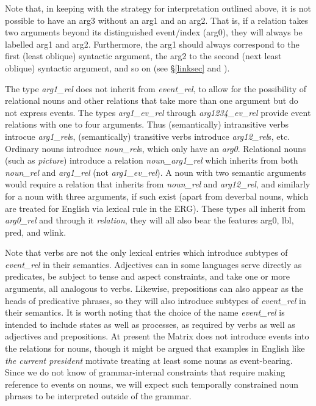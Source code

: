 \documentclass[12pt]{article}
\begin{document}
Note that, in keeping with the strategy for interpretation outlined
above, it is not possible to have an {\sc arg3} without an {\sc arg1}
and an {\sc arg2}.  That is, if a relation takes two arguments 
beyond its distinguished event/index ({\sc arg0}), they will always
be labelled {\sc arg1} and {\sc arg2}.  Furthermore, the {\sc arg1}
should always correspond to the first (least oblique) syntactic
argument, the {\sc arg2} to the second (next least oblique) syntactic
argument, and so on (see \S\ref{linksec} and ).

The type {\it arg1\_rel} does not inherit from {\it event\_rel}, to
allow for the possibility of relational nouns and other relations that
take more than one argument but do not express events.
The types {\it arg1\_ev\_rel} through {\it arg1234\_ev\_rel} provide event
relations with one to four arguments.  Thus (semantically)
intransitive verbs introcue {\it arg1\_rel}s, (semantically) transitive
verbs introduce {\it arg12\_rel}s, etc.  Ordinary nouns introduce {\it
noun\_rel}s, which only have an {\it arg0}.  Relational nouns (such as
{\it picture}) introduce a relation {\it noun\_arg1\_rel} which inherits 
from both {\it noun\_rel} and {\it arg1\_rel} (not {\it
arg1\_ev\_rel}).  A noun with two semantic arguments would require a relation
that inherits from {\it noun\_rel} and {\it arg12\_rel}, and similarly
for a noun with three arguments, if such exist (apart from deverbal nouns,
which are treated for English via lexical rule in the ERG).  These types all 
inherit from {\it arg0\_rel} and
through it {\it relation}, they will all also bear the features {\sc
arg0}, {\sc lbl}, {\sc pred}, and {\sc wlink}.

Note that verbs are not the only lexical entries which introduce subtypes of
{\it event\_rel} in their semantics.  Adjectives can in some languages serve
directly as predicates, be subject to tense and aspect constraints, and take
one or more arguments, all analogous to verbs.  Likewise, prepositions can also
appear as the heads of predicative phrases, so they will also introduce
subtypes of {\it event\_rel} in their semantics.  It is worth noting that
the choice of the name {\it event\_rel} is intended to include states as well
as processes, as required by verbs as well as adjectives and prepositions.
At present the Matrix does not introduce events into the relations for nouns,
though it might be argued that examples in English like {\it the current
president} motivate treating at least some nouns as event-bearing.  Since we
do not know of grammar-internal constraints that require making reference to
events on nouns, we will expect such temporally constrained noun phrases to
be interpreted outside of the grammar.
\end{document}
